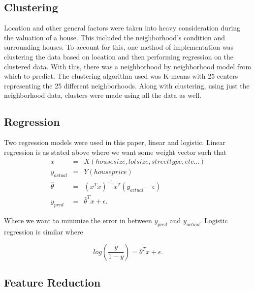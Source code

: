 \documentclass[fleqn,10pt]{SelfArx} %
\begin{document}
\subsection{Clustering}



Location and other general factors were taken into heavy consideration during the valuation of a house. This included the neighborhood's condition and surrounding houses. To
account for this, one method of implementation was clustering the data based on location and then performing regression on the clustered data. With this, there was a neighborhood by neighborhood model from which to predict. The clustering algorithm used was K-means with 25 centers representing the 25 different neighborhoods. Along with clustering, using just the neighborhood data, clusters were made using all the data as well.


\subsection{Regression}

Two regression models were used in this paper, linear and logistic. Linear regression is as stated above where we want some weight vector such that
\begin{eqnarray}
	x &=& X(housesize,lotsize,streettype,etc...)\\
	y_{actual} &=& Y(houseprice)\\
	\hat{\theta} &=& (x^Tx)^{-1}x^T (y_{actual} - \epsilon) \\
	y_{pred} &=& \hat{\theta}^Tx + \epsilon.
\end{eqnarray}

Where we want to minimize the error in between $y_{pred}$ and $y_{actual}$. Logistic regression is similar where

\begin{equation}
	log(\frac{y}{1-y}) = \theta^Tx + \epsilon.
\end{equation}

\subsection{Feature Reduction}
\end{document}
